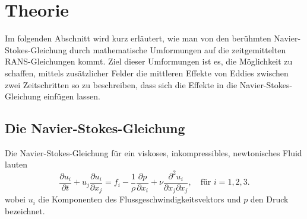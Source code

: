 %
%
%
%
\section{Theorie\label{reynolds:section:teil0}}
%
Im folgenden Abschnitt wird kurz erläutert, wie man von den berühmten Navier-Stokes-Gleichung
durch mathematische Umformungen auf die zeitgemittelten RANS-Gleichungen kommt.
%
Ziel dieser Umformungen ist es, die Möglichkeit zu schaffen, mittels zusätzlicher Felder
die mittleren Effekte von Eddies zwischen zwei Zeitschritten so zu beschreiben, dass sich die
Effekte in die Navier-Stokes-Gleichung einfügen lassen.
%
\subsection{Die Navier-Stokes-Gleichung}
%
Die Navier-Stokes-Gleichung für ein viskoses, inkompressibles, newtonisches Fluid lauten
%
\begin{equation}
    \label{reynolds:eqs:impulse}
    \frac{\partial u_i}{\partial t} + u_j \frac{\partial u_i}{\partial x_j} =
        f_i - \frac{1}{\rho} \frac{\partial p}{\partial x_i} + 
        \nu \frac{\partial^2 u_i}{\partial x_j \partial x_j},\quad\text{für $i = 1,2,3$}.
\end{equation}
%
wobei $u_i$ die Komponenten des Flussgeschwindigkeitsvektors und $p$ den Druck bezeichnet.

